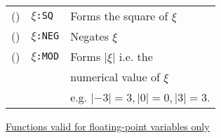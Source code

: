 \documentclass[10pt, a4paper, oneside]{article}
\newcommand{\myuline}[1]{\uline{#1}}
\newcommand{\mytt}[1]{\texttt{\scriptsize #1}}
\newcommand{\mytt}[1]{\texttt{\small #1}}
\newcounter{RowCounter}
\newcommand{\nextRow}{\addtocounter{RowCounter}{1}(\roman{RowCounter})}
\begin{document}
\begin{multicols}{2}
\begin{enumerate}
\begin{minipage}{\columnwidth}
\setcounter{RowCounter}{0}
\begin{tabular}{rll}
\nextRow & $\xi$\mytt{:SQ}  & Forms the square of $\xi$ \\
\nextRow & $\xi$\mytt{:NEG} & Negates $\xi$ \\
\nextRow\setcounter{teMOD}{\theRowCounter} & $\xi$\mytt{:MOD} & Forms $|\xi|$ i.e. the \\
  & & numerical value of $\xi$ \\
  & & e.g.  $|-3|=3, |0| = 0, |3|=3$. \\
\end{tabular}
\end{minipage}

\begin{minipage}{\columnwidth}
\item \myuline{Functions valid for floating-point variables only}


\end{minipage}
\end{enumerate}
\end{multicols}
\end{document}
